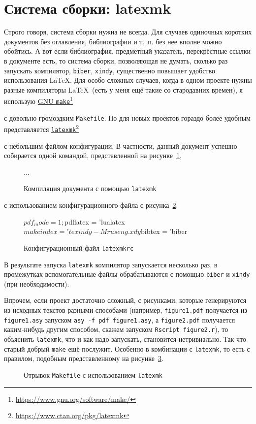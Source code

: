 \documentclass[a4paper,12pt]{article}
\newcommand\foothref[2]{%
  \href{#1}{#2}\footnote{\url{#1}}%
}
\newcommand\exe[1]{\texttt{#1}}
\newcommand\file[1]{\texttt{#1}}
\begin{document}
\section{Система сборки: latexmk}
Строго говоря, система сборки нужна не всегда. Для случаев одиночных коротких
документов без оглавления, библиографии и т.~п. без нее вполне можно
обойтись. А вот если библиография, предметный указатель, перекрёстные
ссылки в документе есть, то система сборки, позволяющая не думать, сколько
раз запускать компилятор, \exe{biber}, \exe{xindy}, существенно
повышает удобство использования \LaTeX. Для особо сложных случаев, когда
в одном проекте нужны разные компиляторы \LaTeX\ (есть у меня ещё такие со
стародавних времен), я использую
\foothref{https://www.gnu.org/software/make/}{GNU \exe{make}}
с довольно громоздким \file{Makefile}. Но для новых проектов гораздо
более удобным представляется
\foothref{https://www.ctan.org/pkg/latexmk}{\exe{latexmk}}
с небольшим файлом конфигурации. В частности, данный документ успешно
собирается одной командой, представленной на рисунке~\ref{latexmk1},
\begin{figure}[tp]
\begin{shcode}

...

%
\end{shcode}
\caption{Компиляция документа с помощью \exe{latexmk}}\label{latexmk1}
\end{figure}
с использованием конфигурационного файла с рисунка~\ref{latexmk2}.
\begin{figure}[tp]
\begin{latexmkcode}
$pdf_mode = 1;
$pdflatex = 'lualatex %
$makeindex = 'texindy -M ruseng.xdy %
$bibtex = 'biber %
\end{latexmkcode}
\caption{Конфигурационный файл \file{latexmkrc}}\label{latexmk2}
\end{figure}
В результате запуска \exe{latexmk} компилятор запускается несколько раз,
в промежутках вспомогательные файлы обрабатываются с помощью \exe{biber}
и \exe{xindy} (при необходимости).

Впрочем, если проект достаточно сложный, с рисунками, которые генерируются
из исходных текстов разными способами (например, \file{figure1.pdf}
получается из \file{figure1.asy} запуском \verb|asy -f pdf figure1.asy|,
а \file{figure2.pdf} получается каким-нибудь другим способом, скажем
запуском \verb|Rscript figure2.r|), то объяснить \exe{latexmk}, что и как
надо запускать, становится нетривиально. Так что старый добрый \exe{make}
ещё послужит. Особенно в комбинации с \exe{latexmk}, то есть с правилом,
подобным представленному на рисунке~\ref{latexmk3}.
\begin{figure}[tp]
\caption{Отрывок \file{Makefile} с использованием
\exe{latexmk}}\label{latexmk3}
\end{figure}
\end{document}
